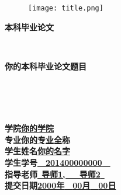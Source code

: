 \thispagestyle{empty}
\begin{figure}[ht]
\centering
\texttt{[image: title.png]}
\end{figure}
\begin{center}
\textbf{本科毕业论文}
\end{center}
\nopagebreak[4]
\begin{center}
\ \\
\end{center}
\nopagebreak[4]
\begin{center}
\textbf{你的本科毕业论文题目}
\end{center}
\nopagebreak[4]
\begin{center}
\ \\\ \\\ \\
\end{center}
\nopagebreak[4]
\begin{spacing}{1.8}
\begin{center}
\textbf{学\quad\quad 院}\quad\underline{\quad\quad\quad\quad\textbf{你的学院}\quad\quad\quad\quad}\\
\textbf{专\quad\quad 业}\quad\underline{\quad\quad\quad\textbf{你的专业全称}\quad\quad\quad}\\
\textbf{学生姓名}\quad\underline{\quad\quad\quad\quad\textbf{你的名字}\quad\quad\quad\quad}\\
\textbf{学生学号}\quad\underline{\quad\quad\ \ \textbf{201400000000}\ \ \quad\quad}\\
\textbf{指导老师}\quad\underline{\quad\quad\ \textbf{导师1,\ \ \ 导师2}\ \quad\quad}\\
\textbf{提交日期}\quad\underline{\quad\textbf{2000年}\ \ \textbf{00月}\ \ \textbf{00日}\quad}
\end{center}
\end{spacing}
\pagebreak[4]
